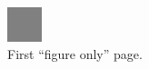 \documentclass[acmtog]{acmart}
\begin{document}



\begin{figure}
    \includegraphics[width=1cm,height=1.15\linewidth]{images/middle_gray_pixel.png}
    \caption{First “figure only” page.}
    \label{fig:temp_fo_1}
\end{figure}
\end{document}
